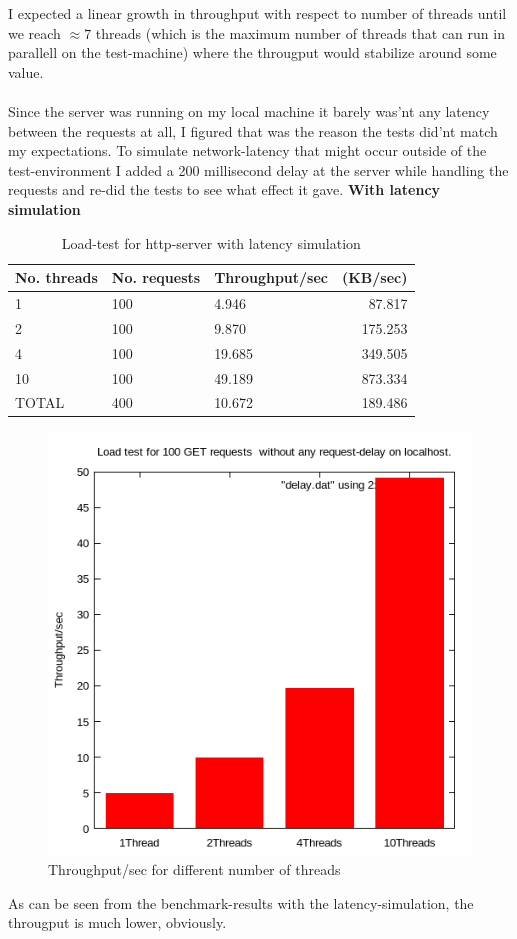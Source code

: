 \documentclass[a4paper, 11pt]{article}
\begin{document}
I expected a linear growth in throughput with respect to number of threads until we reach $\approx 7$ threads (which is the maximum number of threads that can run in parallell on the test-machine) where the througput would stabilize around some value. \\ \\ 
Since the server was running on my local machine it barely was'nt any latency between the requests at all, I figured that was the reason the tests did'nt match my expectations.
To simulate network-latency that might occur outside of the test-environment I added a 200 millisecond delay at the server while handling the requests and re-did the tests to see what  effect it gave.
\textbf{With latency simulation} \\ 
\begin{table}[H]
\centering
\label{Load-test for http-server with latency simulation}
\begin{tabular}{|l|l|l|r|}
\hline
\textbf{No. threads}  & \textbf{No. requests}  & \textbf{Throughput/sec} & \textbf{(KB/sec)} \\ \hline
1 & 100 & 4.946 & 87.817 \\ \hline
2 & 100 & 9.870 & 175.253 \\ \hline
4 & 100 & 19.685 & 349.505 \\ \hline
10 & 100 & 49.189 & 873.334 \\ \hline
TOTAL & 400 & 10.672 & 189.486 \\ \hline
\end{tabular}
\caption{Load-test for http-server with latency simulation}
\end{table}
\begin{figure}[H]
\includegraphics[scale=0.7]{delay.png}
\caption{Throughput/sec for different number of threads}
\end{figure}
As can be seen from the benchmark-results with the latency-simulation, the througput is much lower, obviously.
\end{document}
